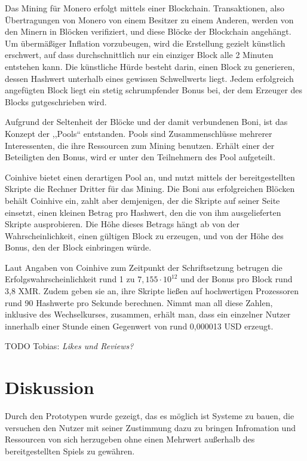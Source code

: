 \documentclass[german]{cgspaper} %
\newcommand{\todo}[1]{\textit{#1}}
\newcommand{\Tobias}[1]{\textcolor{colorTobias}{TODO Tobias:} \todo{#1} }
\begin{document}
Das Mining für Monero erfolgt mittels einer Blockchain. Transaktionen, also Übertragungen von Monero von einem Besitzer zu einem Anderen, werden von den Minern in Blöcken verifiziert, und diese Blöcke der Blockchain angehängt.
Um übermäßiger Inflation vorzubeugen, wird die Erstellung gezielt künstlich erschwert, auf dass durchschnittlich nur ein einziger Block alle 2 Minuten entstehen kann.
Die künstliche Hürde besteht darin, einen Block zu generieren, dessen Hashwert unterhalb eines gewissen Schwellwerts liegt.
Jedem erfolgreich angefügten Block liegt ein stetig schrumpfender Bonus bei, der dem Erzeuger des Blocks gutgeschrieben wird.

Aufgrund der Seltenheit der Blöcke und der damit verbundenen Boni, ist das Konzept der ,,Pools`` entstanden.
Pools sind Zusammenschlüsse mehrerer Interessenten, die ihre Ressourcen zum Mining benutzen.
Erhält einer der Beteiligten den Bonus, wird er unter den Teilnehmern des Pool aufgeteilt.

Coinhive bietet einen derartigen Pool an, und nutzt mittels der bereitgestellten Skripte die Rechner Dritter für das Mining.
Die Boni aus erfolgreichen Blöcken behält Coinhive ein, zahlt aber demjenigen, der die Skripte auf seiner Seite einsetzt, einen kleinen Betrag pro Hashwert, den die von ihm ausgelieferten Skripte ausprobieren.
Die Höhe dieses Betrags hängt ab von der Wahrscheinlichkeit, einen gültigen Block zu erzeugen, und von der Höhe des Bonus, den der Block einbringen würde.

Laut Angaben von Coinhive zum Zeitpunkt der Schriftsetzung betrugen die Erfolgswahrscheinlichkeit rund 1 zu $7,155 \cdot 10^{12}$ und der Bonus pro Block rund 3,8 XMR.
Zudem geben sie an, ihre Skripte ließen auf hochwertigen Prozessoren rund 90 Hashwerte pro Sekunde berechnen.
Nimmt man all diese Zahlen, inklusive des Wechselkurses, zusammen, erhält man, dass ein einzelner Nutzer innerhalb einer Stunde einen Gegenwert von rund 0,000013 USD erzeugt.

\Tobias{Likes und Reviews?}

\section{Diskussion}

Durch den Prototypen wurde gezeigt, das es möglich ist Systeme zu bauen, die versuchen den Nutzer mit seiner Zustimmung dazu zu bringen Infromation und Ressourcen von sich herzugeben ohne einen Mehrwert außerhalb des bereitgestellten Spiels zu gewähren.
\end{document}
